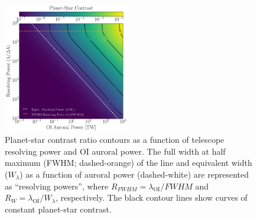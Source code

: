 \documentclass{emulateapj}
\begin{document}
\begin{figure}[bt]
\includegraphics[width=0.49\textwidth]{contrast_vs_R_vs_watts.pdf}
\caption{Planet-star contrast ratio contours as a function of telescope resolving power and OI auroral power. The full width at half maximum (FWHM; dashed-orange) of the line and equivalent width ($W_{\lambda}$) as a function of auroral power (dashed-white) are represented as ``resolving powers'', where $R_{FWHM} = \lambda_{\text{OI}} / FWHM$ and $R_{W} = \lambda_{\text{OI}} / W_{\lambda}$, respectively. The black contour lines show curves of constant planet-star contrast.}
\label{fig:contrast}
\end{figure}
\end{document}

